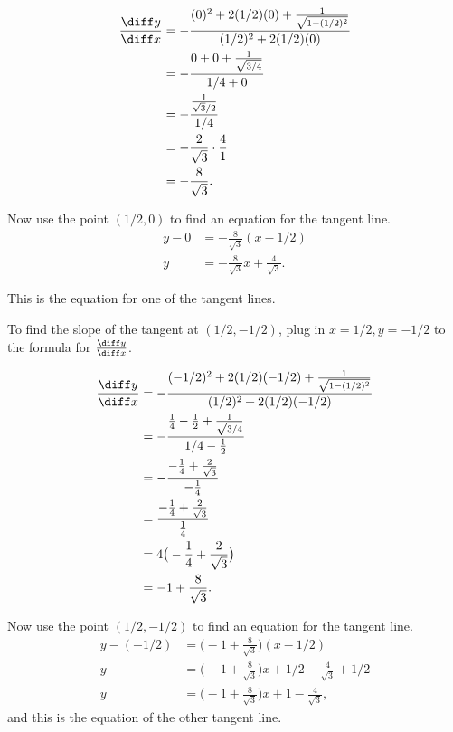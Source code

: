 \begin{enumerate}
{\begin{align*}
\frac{\diff y}{\diff x} & = -\frac{(0)^2+2(1/2)(0) + \frac{1}{\sqrt{1-(1/2)^2}}}{(1/2)^2+2(1/2)(0)} \\
& = -\frac{0+0+\frac{1}{\sqrt{3/4}}}{1/4 + 0} \\
& = -\frac{\frac{1}{\sqrt{3}/2}}{1/4} \\
& = -\frac{2}{\sqrt{3}}\cdot \frac{4}{1} \\
& = -\frac{8}{\sqrt{3}}.
\end{align*}

Now use the point $(1/2,0)$ to find an equation for the tangent line.  
\begin{align*}
y - 0 & = -\frac{8}{\sqrt{3}}(x-1/2) \\
y & = -\frac{8}{\sqrt{3}}x +\frac{4}{\sqrt{3}}.
\end{align*}

This is the equation for one of the tangent lines.  

To find the slope of the tangent at $(1/2,-1/2)$, plug in $x=1/2,y=-1/2$ to the formula for $\frac{\diff y}{\diff x}$.  

\begin{align*}
\frac{\diff y}{\diff x} & = -\frac{(-1/2)^2+2(1/2)(-1/2) + \frac{1}{\sqrt{1-(1/2)^2}}}{(1/2)^2+2(1/2)(-1/2)} \\
& = -\frac{\frac{1}{4}-\frac{1}{2}+\frac{1}{\sqrt{3/4}}}{1/4 -\frac{1}{2}} \\
& = -\frac{-\frac{1}{4}+\frac{2}{\sqrt{3}}}{-\frac{1}{4}} \\
& = \frac{-\frac{1}{4}+\frac{2}{\sqrt{3}}}{\frac{1}{4}} \\
& = 4\big(-\frac{1}{4}+\frac{2}{\sqrt{3}}\big) \\
& = -1 + \frac{8}{\sqrt{3}}.
\end{align*}

Now use the point $(1/2,-1/2)$ to find an equation for the tangent line.  
\begin{align*}
y - (-1/2) & = \Big(-1 + \frac{8}{\sqrt{3}}\Big)(x-1/2) \\
y  & = \Big(-1 + \frac{8}{\sqrt{3}}\Big)x +1/2 - \frac{4}{\sqrt{3}} + 1/2 \\
y  & = \Big(-1 + \frac{8}{\sqrt{3}}\Big)x +1 - \frac{4}{\sqrt{3}},
\end{align*}
and this is the equation of the other tangent line.  
}%


\end{enumerate}

